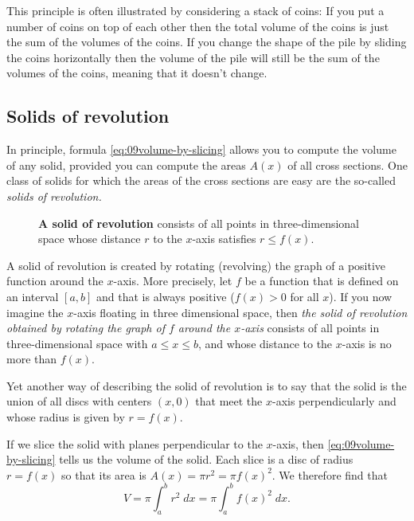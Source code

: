 This principle is often illustrated by considering a stack of coins: If you put
a number of coins on top of each other then the total volume of the coins is
just the sum of the volumes of the coins.  If you change the shape of the pile
by sliding the coins horizontally then the volume of the pile will still be the
sum of the volumes of the coins, meaning that it doesn't change.
\subsection{Solids of revolution} %
In principle, formula \eqref{eq:09volume-by-slicing} allows you to compute the
volume of any solid, provided you can compute the areas $A(x)$ of all cross
sections.  One class of solids for which the areas of the cross sections are
easy are the so-called \emph{solids of revolution.}

\begin{figure}[h]\centering
  \parbox{175pt}{ }
  \parbox{175pt}{ }
  \parbox{175pt}{ }
  \caption{\textbf{A solid of revolution} consists of all points in
    three-dimensional space whose distance $r$ to the $x$-axis satisfies $r\leq
    f(x)$.}
  \label{fig:09surf_of_rotation}
\end{figure}

A solid of revolution is created by rotating (revolving) the graph of a positive
function around the $x$-axis.  More precisely, let $f$ be a function that is
defined on an interval $[a, b]$ and that is always positive ($f(x)>0$ for all
$x$).  If you now imagine the $x$-axis floating in three dimensional space, then
\emph{the solid of revolution obtained by rotating the graph of $f$ around the
  $x$-axis} consists of all points in three-dimensional space with $a\leq x\leq
b$, and whose distance to the $x$-axis is no more than $f(x)$.

Yet another way of describing the solid of revolution is to say that the solid
is the union of all discs with centers $(x,0)$ that meet the $x$-axis perpendicularly and whose
radius is given by $r=f(x)$.

If we slice the solid with planes perpendicular to the $x$-axis, then
\eqref{eq:09volume-by-slicing} tells us the volume of the solid.  Each slice is
a disc of radius $r=f(x)$ so that its area is $A(x) = \pi r^2 = \pi f(x)^2$. We
therefore find that
\begin{equation}
  \label{eq:09volume_surf_of_revolution}
  V = \pi \int_a^b r^2 \; dx = \pi \int_a^b f(x)^2 \; dx.
\end{equation}

